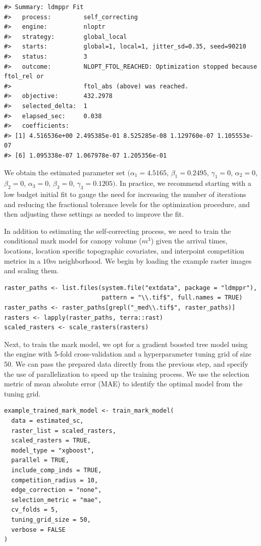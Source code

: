 \begin{verbatim}
#> Summary: ldmppr Fit
#>   process:         self_correcting
#>   engine:          nloptr
#>   strategy:        global_local
#>   starts:          global=1, local=1, jitter_sd=0.35, seed=90210
#>   status:          3
#>   outcome:         NLOPT_FTOL_REACHED: Optimization stopped because ftol_rel or
#>                    ftol_abs (above) was reached.
#>   objective:       432.2978
#>   selected_delta:  1
#>   elapsed_sec:     0.038
#>   coefficients:
#> [1] 4.516536e+00 2.495385e-01 8.525285e-08 1.129760e-07 1.105553e-07
#> [6] 1.095338e-07 1.067978e-07 1.205356e-01
\end{verbatim}

We obtain the estimated parameter set
\((\alpha_1 = 4.5165\),
\(\beta_1 = 0.2495\),
\(\gamma_1 = 0\),
\(\alpha_2 = 0\),
\(\beta_2 = 0\),
\(\alpha_3 = 0\),
\(\beta_3 = 0\),
\(\gamma_3 = 0.1205)\). In practice, we
recommend starting with a low budget initial fit to gauge the need for increasing the number of iterations and reducing the
fractional tolerance levels for the optimization procedure, and then adjusting these settings as needed to improve the fit.

In addition to estimating the self-correcting process, we need to train
the conditional mark model for canopy volume (\(m^3\)) given the arrival
times, locations, location specific topographic covariates, and
interpoint competition metrics in a \(10m\) neighborhood. We begin by
loading the example raster images and scaling them.

\begin{verbatim}
raster_paths <- list.files(system.file("extdata", package = "ldmppr"),
                           pattern = "\\.tif$", full.names = TRUE)
raster_paths <- raster_paths[grepl("_med\\.tif$", raster_paths)]
rasters <- lapply(raster_paths, terra::rast)
scaled_rasters <- scale_rasters(rasters)
\end{verbatim}

Next, to train the mark model, {we opt for a gradient boosted tree model
using the  engine with 5-fold cross-validation and a hyperparameter tuning grid of size 50. We can pass the prepared data directly from the previous step, and specify the use of parallelization to speed up the training process. We use the selection metric of mean absolute error (MAE) to identify the optimal model from the tuning grid.}

\begin{verbatim}
example_trained_mark_model <- train_mark_model(
  data = estimated_sc,
  raster_list = scaled_rasters,
  scaled_rasters = TRUE,
  model_type = "xgboost",
  parallel = TRUE,
  include_comp_inds = TRUE,
  competition_radius = 10,
  edge_correction = "none",
  selection_metric = "mae",
  cv_folds = 5,
  tuning_grid_size = 50,
  verbose = FALSE
)
\end{verbatim}

